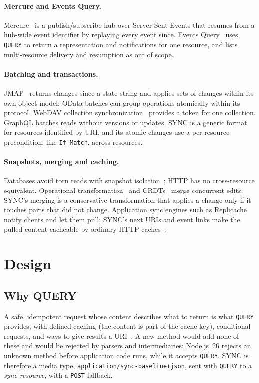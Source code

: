 \documentclass[11pt,a4paper]{article}
\begin{document}
\paragraph{Mercure and Events Query.}
Mercure~\cite{mercure} is a publish/subscribe hub over Server-Sent Events that resumes from a hub-wide event identifier by replaying every event since. Events Query~\cite{eventsquery} uses \texttt{QUERY} to return a representation and notifications for one resource, and lists multi-resource delivery and resumption as out of scope.

\paragraph{Batching and transactions.}
JMAP~\cite{rfc8620} returns changes since a state string and applies sets of changes within its own object model; OData batches can group operations atomically within its protocol. WebDAV collection synchronization~\cite{rfc6578} provides a token for one collection. GraphQL batches reads without versions or updates. SYNC is a generic format for resources identified by URI, and its atomic changes use a per-resource precondition, like \texttt{If-Match}, across resources.

\paragraph{Snapshots, merging and caching.}
Databases avoid torn reads with snapshot isolation~\cite{berenson1995}; HTTP has no cross-resource equivalent. Operational transformation~\cite{ellis1989} and CRDTs~\cite{shapiro2011} merge concurrent edits; SYNC's merging is a conservative transformation that applies a change only if it touches parts that did not change. Application sync engines such as Replicache notify clients and let them pull; SYNC's next URIs and event links make the pulled content cacheable by ordinary HTTP caches~\cite{rfc9111}.

\section{Design}
\label{sec:design}

\subsection{Why QUERY}

A safe, idempotent request whose content describes what to return is what \texttt{QUERY} provides, with defined caching (the content is part of the cache key), conditional requests, and ways to give results a URI~\cite{rfc10008}. A new method would add none of these and would be rejected by parsers and intermediaries: Node.js~26 rejects an unknown method before application code runs, while it accepts \texttt{QUERY}. SYNC is therefore a media type, \texttt{application/sync-baseline+json}, sent with \texttt{QUERY} to a \emph{sync resource}, with a \texttt{POST} fallback.
\end{document}
